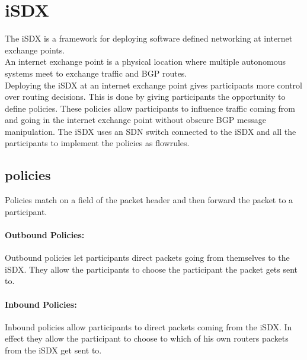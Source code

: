 \section{\label{chapter2:iSDX}iSDX}


The iSDX is a framework for deploying software defined networking at internet exchange points. \\
An internet exchange point is a physical location where multiple autonomous systems meet to exchange traffic and BGP routes. \\
Deploying the iSDX at an internet exchange point gives participants more control over routing decisions. This is done by giving participants the opportunity to define policies. These policies allow participants to influence traffic coming from and going in the internet exchange point without obscure BGP message manipulation. The iSDX uses an SDN switch connected to the iSDX and all the participants to implement the policies as flowrules.

\subsection{\label{chapter2:iSDX:policies}policies}
Policies match on a field of the packet header and then forward the packet to a participant.
\paragraph{\label{chapter2:iSDX:policies:outbound policies}Outbound Policies:}
Outbound policies let participants direct packets going from themselves to the iSDX. They allow the participants to choose the participant the packet gets sent to.
\paragraph{\label{chapter2:iSDX:policies:inbound policies}Inbound Policies:}
Inbound policies allow participants to direct packets coming from the iSDX. In effect they allow the participant to choose to which of his own routers packets from the iSDX get sent to. 

